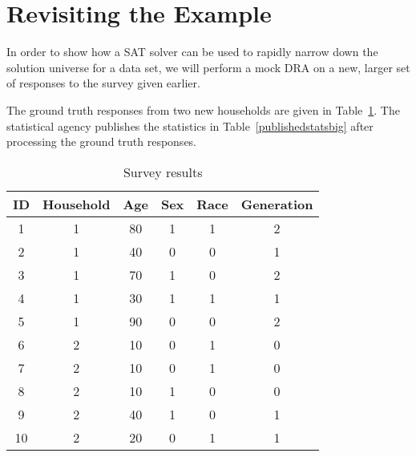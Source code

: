 \documentclass[5p,times,11pt]{elsarticle}
\begin{document}
\section{Revisiting the Example}

In order to show how a SAT solver can be used to rapidly narrow down the solution universe for a data set, we will perform a mock DRA on a new, larger set of responses to the survey given earlier.

The ground truth responses from two new households are given in Table~\ref{resultsbig}. The statistical agency publishes the statistics in Table~\ref{publishedstatsbig} after processing the ground truth responses.
\begin{table}[t]
\begin{tabular}{c|c|c|c|c|c}
ID & Household & Age & Sex & Race & Generation \\
\hline
1 & 1 & 80 & 1 & 1 & 2  \\
2 & 1 & 40 & 0 & 0 & 1  \\
3 & 1 & 70 & 1 & 0 & 2  \\
4 & 1 & 30 & 1 & 1 & 1  \\
5 & 1 & 90 & 0 & 0 & 2  \\
6 & 2 & 10 & 0 & 1 & 0  \\
7 & 2 & 10 & 0 & 1 & 0  \\
8 & 2 & 10 & 1 & 0 & 0  \\
9 & 2 & 40 & 1 & 0 & 1 \\
10 & 2 & 20 & 0 & 1 & 1 \\
\hline
\end{tabular}
\caption{Survey results}\label{resultsbig}
\end{table}
\end{document}
